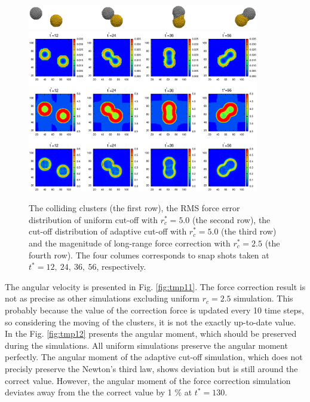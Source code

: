 \documentclass[aps,pre,preprint]{revtex4-1}
\newcommand{\recheck}[1]{{\color{red} #1}}
\begin{document}
\begin{figure}
  \centering
  \includegraphics[width=0.90\textwidth]{fig/error-rcut-ball.eps} 
  \includegraphics[width=0.90\textwidth]{fig/error-rcut.eps}
  \caption{The colliding clusters (the first row), the RMS force error
    distribution of uniform cut-off with $r_c^\ast = 5.0$ (the second
    row), the cut-off distribution of adaptive cut-off with $r_c^\ast
    = 5.0$ (the third row) and the magenitude of long-range force
    correction with $r_c^\ast = 2.5$ (the fourth row). The four
    columes corresponds to snap shots taken at $t^\ast = 12,\ 24,\
    36,\ 56$, respectively.  }
  \label{fig:tmp10}
\end{figure}


The angular velocity is presented in Fig. \ref{fig:tmp11}. The force
correction result is not as precise as other simulations excluding
uniform $r_c = 2.5$ simulation. This probably because the value of the
correction force is updated every 10 time steps, so considering the
moving of the clusters, it is not the exactly up-to-date value.
In the Fig. \ref{fig:tmp12} presents the angular moment, which should be
preserved during the simulations. All uniform simulations
preserve the angular moment perfectly. The angular moment of the
adaptive cut-off simulation, which does not precisly preserve the
Newton's third law, shows deviation but is still around the correct
value. However, the angular moment of the force correction simulation
deviates away from the the correct value by 1 \% at $t^\ast = 130$.
\end{document}

